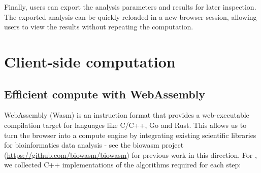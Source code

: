 \documentclass{article}
\begin{document}
Finally, users can export the analysis parameters and results for later inspection.
The exported analysis can be quickly reloaded in a new browser session, allowing users to view the results without repeating the computation.

\section{Client-side computation}

\subsection{Efficient compute with WebAssembly}

WebAssembly (Wasm) is an instruction format that provides a web-executable compilation target for languages like C/C++, Go and Rust.
This allows us to turn the browser into a compute engine by integrating existing scientific libraries for bioinformatics data analysis -
see the biowasm project (\url{https://github.com/biowasm/biowasm}) for previous work in this direction.
For , we collected C++ implementations of the algorithms required for each step:
\end{document}

